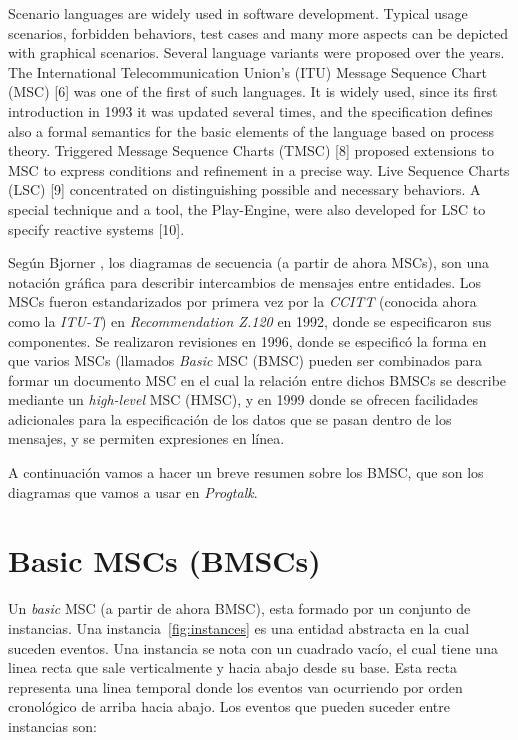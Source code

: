 Scenario languages are widely used in software development. Typical
usage scenarios, forbidden behaviors, test cases and many more aspects
can be depicted with graphical scenarios. Several language variants
were proposed over the years. The International Telecommunication
Union’s (ITU) Message Sequence Chart (MSC) [6] was one of the first of
such languages. It is widely used, since its first introduction in
1993 it was updated several times, and the specification defines also
a formal semantics for the basic elements of the language based on
process theory. Triggered Message Sequence Charts (TMSC) [8] proposed
extensions to MSC to express conditions and refinement in a precise
way. Live Sequence Charts (LSC) [9] concentrated on distinguishing
possible and necessary behaviors. A special technique and a tool, the
Play-Engine, were also developed for LSC to specify reactive systems
[10].


Según Bjorner \cite{bjorner}, los diagramas de secuencia (a partir de
ahora MSCs),  son una notación gráfica para describir
intercambios de mensajes entre entidades. Los MSCs fueron
estandarizados por primera vez por la \textit{CCITT} (conocida ahora
como la \textit{ITU-T}) en \textit{Recommendation Z.120} en 1992,
donde se especificaron sus componentes.
Se realizaron revisiones en 1996, donde se especificó la
forma en que varios MSCs (llamados \textit{Basic} MSC (BMSC) pueden
ser combinados para formar un documento MSC en el cual la relación entre
dichos BMSCs se describe mediante un \textit{high-level} MSC (HMSC), y
en 1999 donde se ofrecen facilidades adicionales para la
especificación de los datos que se pasan dentro de los mensajes, y se
permiten expresiones en línea.

A continuación vamos a hacer un breve resumen sobre los BMSC, que son
los diagramas que vamos a usar en \textit{Progtalk}.

\section{Basic MSCs (BMSCs)}
Un \textit{basic} MSC (a partir de ahora BMSC), esta formado por un
conjunto de instancias. Una instancia~\ref{fig:instances} es una
entidad abstracta en la cual suceden eventos. Una instancia se nota
con un cuadrado vacío, el cual tiene una linea recta que sale
verticalmente y hacia abajo desde su base. Esta recta representa una
linea temporal donde los eventos van ocurriendo por orden cronológico
de arriba hacia abajo. Los eventos que pueden suceder entre instancias son:

